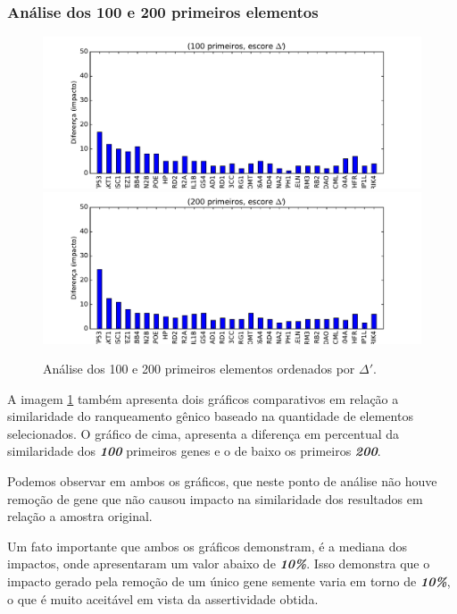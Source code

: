 \subsubsection{Análise dos 100 e 200 primeiros elementos}
%
\begin{figure}[ht!]
\includegraphics[width=1\textwidth]{Images/analyses/fig_LOO_S_100.pdf}
\includegraphics[width=1\textwidth]{Images/analyses/fig_LOO_S_200.pdf}
\caption {Análise dos 100 e 200 primeiros elementos ordenados por $\Delta'$.
\label{fig_LOO_S_100-200}}
\end{figure}
%
A imagem \ref{fig_LOO_S_100-200} também apresenta dois gráficos comparativos em relação a similaridade do ranqueamento gênico baseado na quantidade de elementos selecionados. O gráfico de cima, apresenta a diferença em percentual da similaridade dos \textbf{\textit{100}} primeiros genes e o de baixo os primeiros \textbf{\textit{200}}.

%
Podemos observar em ambos os gráficos, que neste ponto de análise não houve remoção de gene que não causou impacto na similaridade dos resultados em relação a amostra original.

%
Um fato importante que ambos os gráficos demonstram, é a mediana dos impactos, onde apresentaram um valor abaixo de \textbf{\textit{10\%}}. Isso demonstra que o impacto gerado pela remoção de um único gene semente varia em torno de \textbf{\textit{10\%}}, o que é muito aceitável em vista da assertividade obtida.

